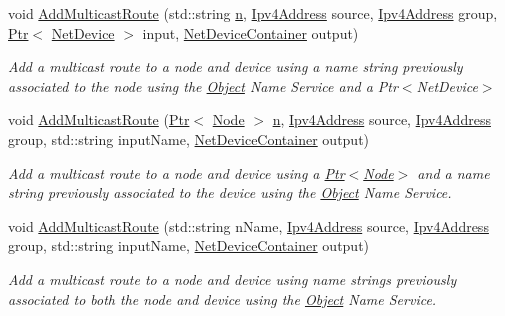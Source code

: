 \begin{DoxyCompactItemize}
void \hyperlink{classns3_1_1Ipv4StaticRoutingHelper_a52046284c4a7d33f84a81ad33dfd66d4}{Add\+Multicast\+Route} (std\+::string \hyperlink{lte__link__budget__x2__handover__measures_8m_abdb05bc5a064cf642a06c83b3392f148}{n}, \hyperlink{classns3_1_1Ipv4Address}{Ipv4\+Address} source, \hyperlink{classns3_1_1Ipv4Address}{Ipv4\+Address} group, \hyperlink{classns3_1_1Ptr}{Ptr}$<$ \hyperlink{classns3_1_1NetDevice}{Net\+Device} $>$ input, \hyperlink{classns3_1_1NetDeviceContainer}{Net\+Device\+Container} output)
\begin{DoxyCompactList}\small\item\em Add a multicast route to a node and device using a name string previously associated to the node using the \hyperlink{classns3_1_1Object}{Object} Name Service and a Ptr$<$\+Net\+Device$>$ \end{DoxyCompactList}\item 
void \hyperlink{classns3_1_1Ipv4StaticRoutingHelper_a8f1c020b21aedf9fd8effcef3940b0f0}{Add\+Multicast\+Route} (\hyperlink{classns3_1_1Ptr}{Ptr}$<$ \hyperlink{classns3_1_1Node}{Node} $>$ \hyperlink{lte__link__budget__x2__handover__measures_8m_abdb05bc5a064cf642a06c83b3392f148}{n}, \hyperlink{classns3_1_1Ipv4Address}{Ipv4\+Address} source, \hyperlink{classns3_1_1Ipv4Address}{Ipv4\+Address} group, std\+::string input\+Name, \hyperlink{classns3_1_1NetDeviceContainer}{Net\+Device\+Container} output)
\begin{DoxyCompactList}\small\item\em Add a multicast route to a node and device using a \hyperlink{classns3_1_1Ptr}{Ptr$<$\+Node$>$} and a name string previously associated to the device using the \hyperlink{classns3_1_1Object}{Object} Name Service. \end{DoxyCompactList}\item 
void \hyperlink{classns3_1_1Ipv4StaticRoutingHelper_ad4e1b19d7df693754de7f808dbce521e}{Add\+Multicast\+Route} (std\+::string n\+Name, \hyperlink{classns3_1_1Ipv4Address}{Ipv4\+Address} source, \hyperlink{classns3_1_1Ipv4Address}{Ipv4\+Address} group, std\+::string input\+Name, \hyperlink{classns3_1_1NetDeviceContainer}{Net\+Device\+Container} output)
\begin{DoxyCompactList}\small\item\em Add a multicast route to a node and device using name strings previously associated to both the node and device using the \hyperlink{classns3_1_1Object}{Object} Name Service. \end{DoxyCompactList}\item 

\end{DoxyCompactItemize}
